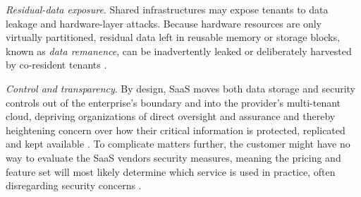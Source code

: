 \documentclass[11pt, a4paper, oneside, draft]{scrartcl}
\begin{document}
                \begin{enumerate}[label={[\arabic*]:},
                    ref=Challenge~\arabic*,
                    leftmargin=*,
                    itemsep=0.6\baselineskip]

                    \item\label{chal:remanence}
                        \textit{Residual-data exposure}.
                        Shared infrastructures may expose tenants to data leakage and hardware-layer
                        attacks. 
                        Because hardware resources are only virtually partitioned,
                        residual data left in reusable memory or storage blocks,
                        known as \textit{data remanence},
                        can be inadvertently leaked or deliberately harvested by co-resident tenants
                        \parencites[p.~586]{zissis2012}[pp.~344--345]{aljahdali2014}.

                    \item\label{chal:transparency}
                        \textit{Control and transparency}.
                        By design, SaaS moves both data storage and security controls out of the
                        enterprise's boundary and into the provider's multi-tenant cloud,
                        depriving organizations of direct oversight and assurance and thereby
                        heightening concern over how their critical information is protected,
                        replicated and kept available \parencite[pp.~3--4]{subashini2011}.
                        To complicate matters further, the customer might have no way to evaluate
                        the SaaS vendors security measures, meaning the pricing and feature set will
                        most likely determine which service is used in practice, often disregarding
                        security concerns \parencites[p.~6]{everett2009}[p.~836]{khorshed2012}.


\end{enumerate}
\end{document}
